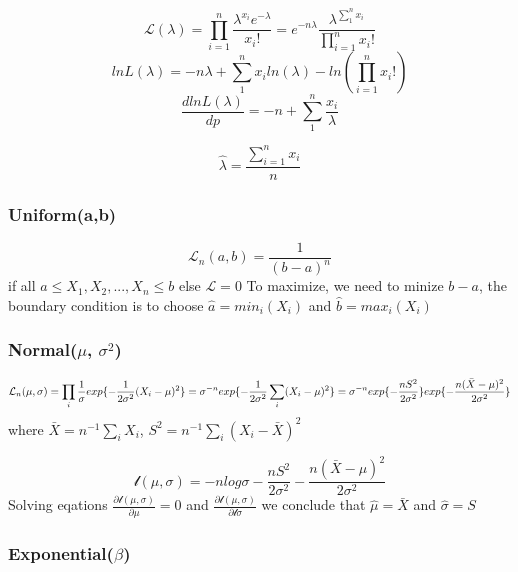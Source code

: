 \documentclass[]{article}
\begin{document}
\[
\mathcal{L}(\lambda)=\prod_{i=1}^{n}\frac{{\lambda}^{{x}_{i}}{e}^{-\lambda}}{{x}_{i}!} = {e}^{-n\lambda} \frac{{\lambda}^{\sum_{1}^{n}{x}_{i}}}{\prod_{i=1}^{n}{x}_{i}!}
\] \[
lnL(\lambda)=-n\lambda+\sum_{1}^{n}{x}_{i}ln(\lambda)-ln\left(\prod_{i=1}^{n}{x}_{i}!\right)
\]
\[\frac{dlnL(\lambda)}{dp}=-n+   \sum_{1}^{n} \frac{ x_i } {\lambda} \]

\[\hat{\lambda}=\frac{\sum_{i=1}^{n}{x}_{i}}{n}\]

\hypertarget{uniformab}{%
\subsubsection{Uniform(a,b)}\label{uniformab}}

\[
\mathcal{L}_n(a, b)=\frac{1}{(b-a)^n}
\] if all \(a \le X_1, X_2, ..., X_n \le b\) else \(\mathcal{L}=0\) To
maximize, we need to minize \(b-a\), the boundary condition is to choose
\(\hat{a}=min_i(X_i)\) and \(\hat{b}=max_i(X_i)\)

\hypertarget{normalmu-sigma2}{%
\subsubsection{\texorpdfstring{Normal(\(\mu\),
\(\sigma^2\))}{Normal(\textbackslash{}mu, \textbackslash{}sigma\^{}2)}}\label{normalmu-sigma2}}

\[
\mathcal{L}_n(\mu, \sigma) =\prod_i \frac{1}{\sigma} exp\{- \frac{1}{2 \sigma^2} (X_i-\mu)^2 \} \\
                          =\sigma^{-n}exp\{ -\frac{1}{2\sigma^2}\sum_i(X_i-\mu)^2 \}\\
                          =\sigma^{-n}exp\{ -\frac{nS^2}{2\sigma^2}\} exp\{- \frac{n(\bar{X} -\mu)^2}{2\sigma^2} \}
\] where \(\bar{X}=n^{-1}\sum_i X_i\),
\(S^2=n^{-1}\sum_i (X_i - \bar{X})^2\)

\[
\mathcal{l}(\mu, \sigma)=-n log\sigma - \frac{nS^2}{2\sigma^2}- \frac{n(\bar{X}-\mu )^2}{2\sigma^2}
\] Solving eqations
\(\frac{ \partial \mathcal{l}(\mu, \sigma) }{\partial \mu} =0\) and
\(\frac{ \partial \mathcal{l}(\mu, \sigma)} {\partial \mathcal{l} \sigma}\)
we conclude that \(\hat{\mu}=\bar{X}\) and \(\hat{\sigma}=S\)

\hypertarget{exponentialbeta}{%
\subsubsection{\texorpdfstring{Exponential(\(\beta\))}{Exponential(\textbackslash{}beta)}}\label{exponentialbeta}}
\end{document}
